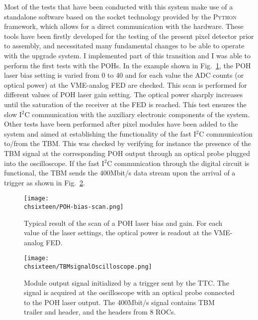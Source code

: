 Most of the tests that have been conducted with this system make use of a standalone software based on the socket technology provided by the \textsc{Python} framework,
which allows for a direct communication with the hardware. 
These tools have been firstly developed for the testing of the present pixel detector prior to assembly\cite{Caminada:2010gsa}, and necessitated many fundamental changes to be able to operate with the upgrade system.
I implemented part of this transition and I was able to perform the first tests with the POHs.
In the example shown in Fig.~\ref{fig:TestPOH}, the POH laser bias setting is varied from 0 to 40 and for each value the ADC counts (or optical power) at the VME-analog FED are checked.
This scan is performed for different values of POH laser gain setting.
The optical power sharply increases until the saturation of the receiver at the FED is reached.
This test ensures the slow I$^2$C communication with the auxiliary electronic components of the system.
Other tests have been performed after pixel modules have been added to the system and aimed at establishing the functionality of the fast I$^2$C communication to/from the TBM.
This was checked by verifying for instance the presence of the TBM signal at the corresponding POH output through an optical probe plugged into the oscilloscope.
If the fast I$^2$C communication through the digital circuit is functional, the TBM sends the 400\unit{Mbit/s} data stream upon the arrival of a trigger as shown in Fig.~\ref{fig:TestTBM}.

\begin{figure}[!htb]
 \begin{center}
  \texttt{[image: \\chsixteen/POH-bias-scan.png]}
 \end{center}
 \caption{Typical result of the scan of a POH laser bias and gain. For each value of the laser settings, the optical power is readout at the VME-analog FED.}
 \label{fig:TestPOH}
\end{figure} 

\begin{figure}[!htb]
 \begin{center}
  \texttt{[image: \\chsixteen/TBMsignalOscilloscope.png]}
 \end{center}
 \caption{Module output signal initialized by a trigger sent by the TTC. The signal is acquired at the oscilloscope with an optical probe connected to the POH laser output. The 400\unit{Mbit/s} signal contains TBM trailer and header, and the headers from 8 ROCs.}
 \label{fig:TestTBM}
\end{figure} 

